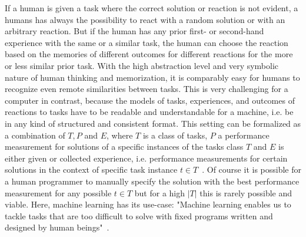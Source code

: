 If a human is given a task where the correct solution or reaction is not evident, a humans has always the possibility to react with a random solution or with an arbitrary reaction.
But if the human has any prior first- or second-hand experience with the same or a similar task, the human can choose the reaction based on the memories of different outcomes for different reactions for the more or less similar prior task.
With the high abstraction level and very symbolic nature of human thinking and memorization, it is comparably easy for humans to recognize even remote similarities between tasks.\newline
This is very challenging for a computer in contrast, because the models of tasks, experiences, and outcomes of reactions to tasks have to be readable and understandable for a machine, i.e. be in any kind of structured and consistent format.
This setting can be formalized as a combination of $T, P$ and $E$, where $T$ is a class of tasks, $P$ a performance measurement for solutions of a specific instances of the tasks class $T$ and $E$ is either given or collected experience, i.e. performance measurements for certain solutions in the context of specific task instance $t\in T$~\cite{Mitchell-MachineLearning}.\newline
Of course it is possible for a human programmer to manually specify the solution with the best performance measurement for any possible $t\in T$ but for a high $|T|$ this is rarely possible and viable.
Here, machine learning has its use-case: "Machine learning enables us to tackle tasks that are too difficult to solve with fixed programs written and designed by human beings"~\cite{Goodfellow-DeepLearning}.

